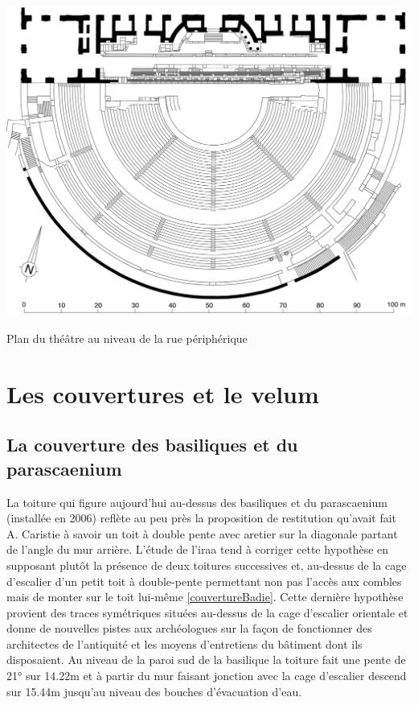 	\begin{figureth}
		\includegraphics[width=\linewidth]{images/3emeniveau}
		\caption[Vue de dessus - 3ème niveau]{Plan du théâtre au niveau de la rue périphérique \cite[Pl. XIX]{orangePl}}
		\label{3emeniveau}
	\end{figureth}	
		
		
		\section{Les couvertures et le velum}
		
		\subsection{La couverture des \glspl{basilique} et du \gls{parascaenium}}
		
		La toiture qui figure aujourd'hui au-dessus des \glspl{basilique} et du \gls{parascaenium} (installée en 2006) reflète au peu près la proposition de restitution qu'avait fait A. Caristie à savoir un toit à double pente avec \gls{aretier} sur la diagonale partant de l'angle du mur arrière. L'étude de l'\gls{iraa} tend à corriger cette hypothèse en supposant plutôt la présence de deux toitures successives et, au-dessus de la cage d’escalier d’un petit toit à double-pente permettant non pas l’accès aux combles mais de monter sur le toit lui-même \ref{couvertureBadie}. Cette dernière hypothèse provient des traces symétriques situées au-dessus de la cage d’escalier orientale et donne de nouvelles pistes aux archéologues sur la façon de fonctionner des architectes de l'antiquité et les moyens d'entretiens du bâtiment dont ils disposaient. 
		Au niveau de la paroi sud de la \gls{basilique} la toiture fait une pente de 21° sur 14.22m et à partir du mur faisant jonction avec la cage d'escalier descend sur 15.44m jusqu'au niveau des bouches d'évacuation d'eau. 
		
